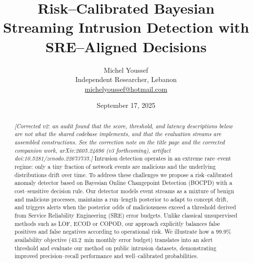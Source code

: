 \documentclass{article}
\title{Risk--Calibrated Bayesian Streaming Intrusion Detection with SRE--Aligned Decisions}
\author{Michel Youssef\\Independent Researcher, Lebanon\\\href{mailto:michelyoussef@hotmail.com}{michelyoussef@hotmail.com}}
\date{September 17, 2025}
\begin{document}
\maketitle

\begin{center}
\end{center}

\begin{abstract}
\emph{[Corrected v2: an audit found that the score, threshold, and latency
descriptions below are not what the shared codebase implements, and that the
evaluation streams are assembled constructions. See the correction note on
the title page and the corrected companion work, arXiv:2605.24696 (v3
forthcoming), artifact doi:10.5281/zenodo.22673735.]}
Intrusion detection operates in an extreme rare--event regime: only a tiny fraction of network events are malicious and the underlying distributions drift over time.  To address these challenges we propose a risk--calibrated anomaly detector based on Bayesian Online Changepoint Detection (BOCPD) with a cost--sensitive decision rule.  Our detector models event streams as a mixture of benign and malicious processes, maintains a run--length posterior to adapt to concept drift, and triggers alerts when the posterior odds of maliciousness exceed a threshold derived from Service Reliability Engineering (SRE) error budgets.  Unlike classical unsupervised methods such as LOF\cite{breunig2000lof}, ECOD\cite{li2022ecod} or COPOD\cite{li2020copod}, our approach explicitly balances false positives and false negatives according to operational risk.  We illustrate how a 99.9\% availability objective (\(43.2\)~min monthly error budget) translates into an alert threshold and evaluate our method on public intrusion datasets, demonstrating improved precision--recall performance and well--calibrated probabilities.
\end{abstract}
\end{document}
